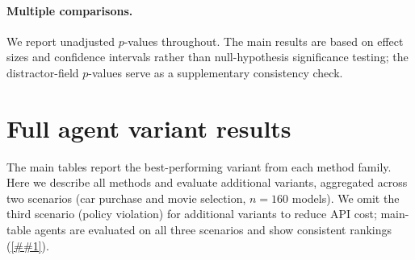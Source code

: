\documentclass{article} %
\newcommand{\Cref}[1]{\ref{##1}}
\begin{document}
\paragraph{Multiple comparisons.}
We report unadjusted $p$-values throughout.
The main results are based on effect sizes and confidence intervals rather than null-hypothesis significance testing; the distractor-field $p$-values serve as a supplementary consistency check.

\section{Full agent variant results}
\label{app:variants}

The main tables report the best-performing variant from each method family. Here we describe all methods and evaluate additional variants, aggregated across two scenarios (car purchase and movie selection, $n{=}160$ models). We omit the third scenario (policy violation) for additional variants to reduce API cost; main-table agents are evaluated on all three scenarios and show consistent rankings (\Cref{app:format}).
\end{document}

